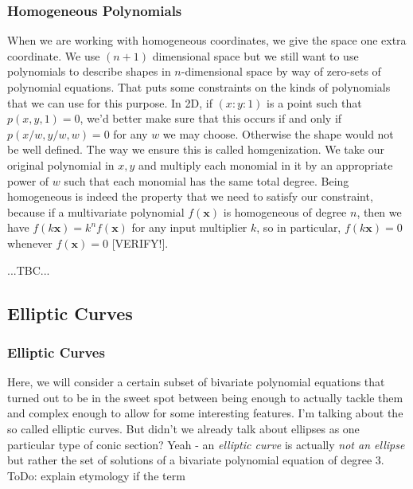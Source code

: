 \subsubsection{Homogeneous Polynomials}
When we are working with homogeneous coordinates, we give the space one extra coordinate. We use $(n+1)$ dimensional space but we still want to use polynomials to describe shapes in $n$-dimensional space by way of zero-sets of polynomial equations. That puts some constraints on the kinds of polynomials that we can use for this purpose. In 2D, if $(x : y : 1)$ is a point such that $p(x,y,1) = 0$, we'd better make sure that this occurs if and only if $p(x/w, y/w, w) = 0$ for any $w$ we may choose. Otherwise the shape would not be well defined. The way we ensure this is called homgenization. We take our original polynomial in $x,y$ and multiply each monomial in it by an appropriate power of $w$ such that each monomial has the same total degree. Being homogeneous is indeed the property that we need to satisfy our constraint, because if a multivariate polynomial $f(\mathbf{x})$ is homogeneous of degree $n$, then we have $f(k \mathbf{x}) = k^n f(\mathbf{x})$ for any input multiplier $k$, so in particular, $f(k \mathbf{x}) = 0$ whenever $f(\mathbf{x}) = 0$ [VERIFY!].

...TBC...


\subsection{Elliptic Curves}

\subsubsection{Elliptic Curves} 
Here, we will consider a certain subset of bivariate polynomial equations that turned out to be in the sweet spot between being enough to actually tackle them and complex enough to allow for some interesting features. I'm talking about the so called elliptic curves. But didn't we already talk about ellipses as one particular type of conic section? Yeah - an \emph{elliptic curve} is actually \emph{not an ellipse} but rather the set of solutions of a bivariate polynomial equation of degree 3. ToDo: explain etymology if the term

